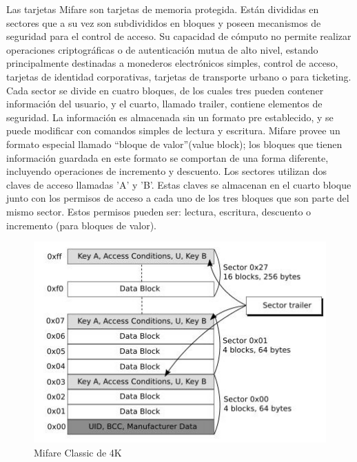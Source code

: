 Las tarjetas Mifare son tarjetas de memoria protegida. Están divididas en sectores que a su vez son subdivididos en bloques y poseen mecanismos de seguridad para el control de acceso. Su capacidad de cómputo no permite realizar operaciones criptográficas o de autenticación mutua de alto nivel, estando principalmente destinadas a monederos electrónicos simples, control de acceso, tarjetas de identidad corporativas, tarjetas de transporte urbano o para ticketing.
Cada sector se divide en cuatro bloques, de los cuales tres pueden contener información del usuario, y el cuarto, llamado trailer, contiene elementos de seguridad. La información es almacenada sin un  formato pre establecido, y se puede modificar con comandos simples de lectura y escritura. Mifare provee un formato especial llamado “bloque de valor”(value block); los bloques que tienen información guardada en este formato se comportan de una forma diferente, incluyendo operaciones de incremento y descuento.
Los sectores utilizan dos claves de acceso llamadas 'A' y 'B'. Estas claves se almacenan en el cuarto bloque junto con los permisos de acceso a cada uno de los tres bloques que son parte del mismo sector. Estos permisos pueden ser: lectura, escritura, descuento o incremento (para bloques de valor).

\begin{figure}[H]
\centering
  \begin{center}
  \includegraphics[scale=.6]{Imagenes/sc3.jpg} 
  \end{center}
  \caption{Mifare Classic de 4K}\label{Fig:HW} 
\end{figure}

